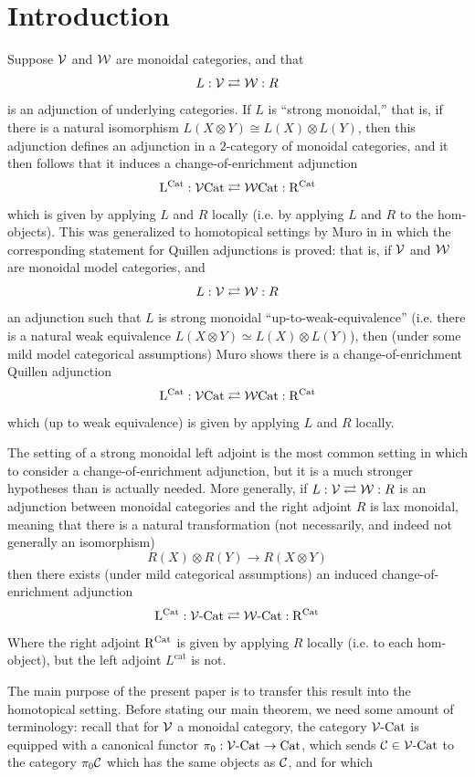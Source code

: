 \documentclass[12pt]{amsart}
\begin{document}
\section*{Introduction}
Suppose $\mathcal{V}$ and $\mathcal{W}$ are monoidal categories, and that 
$$L: \mathcal{V} \rightleftarrows \mathcal{W}: R $$
is an adjunction of underlying categories.
If $L$ is ``strong monoidal,'' that is, if there is a natural isomorphism $L(X \otimes Y) \cong L(X) \otimes L(Y)$, then this adjunction defines an adjunction in a $2$-category of monoidal categories, and it then follows that it induces a change-of-enrichment adjunction
$$\mathrm{L}^{\mathrm{Cat}}: \mathcal{V}\mathrm{Cat} \rightleftarrows \mathcal{W}\mathrm{Cat}: \mathrm{R}^{\mathrm{Cat}}$$
which is given by applying $L$ and $R$ locally (i.e. by applying $L$ and $R$ to the hom-objects).
This was generalized to homotopical settings by Muro in \cite{Muro2012} in which the corresponding statement for Quillen adjunctions is proved: that is, if $\mathcal{V}$ and $\mathcal{W}$ are monoidal model categories, and
$$L: \mathcal{V} \rightleftarrows \mathcal{W}: R $$
an adjunction such that $L$ is strong monoidal ``up-to-weak-equivalence'' (i.e. there is a natural weak equivalence $L(X \otimes Y) \simeq L(X) \otimes L(Y)$), then (under some mild model categorical assumptions) Muro shows there is a change-of-enrichment Quillen adjunction
$$\mathrm{L}^{\mathrm{Cat}}: \mathcal{V}\mathrm{Cat} \rightleftarrows \mathcal{W}\mathrm{Cat}: \mathrm{R}^{\mathrm{Cat}}$$
which (up to weak equivalence) is given by applying $L$ and $R$ locally.
\par
The setting of a strong monoidal left adjoint is the most common setting in which to consider a change-of-enrichment adjunction, but it is a much stronger hypotheses than is actually needed. 
More generally, if $L: \mathcal{V} \rightleftarrows \mathcal{W}: R $ is an adjunction between monoidal categories and the right adjoint $R$ is lax monoidal, meaning that there is a natural transformation (not necessarily, and indeed not generally an isomorphism) 
$$R(X) \otimes R(Y) \to R(X \otimes Y)$$
then there exists (under mild categorical assumptions) an induced change-of-enrichment adjunction
$$\mathrm{L}^{\mathrm{Cat}}: \mathcal{V}\text{-}\mathrm{Cat} \rightleftarrows \mathcal{W}\text{-}\mathrm{Cat}: \mathrm{R}^{\mathrm{Cat}}$$
Where the right adjoint $\mathrm{R}^{\mathrm{Cat}}$ is given by applying $R$ locally (i.e. to each hom-object), but the left adjoint $L^\mathrm{cat}$ is not.
\par 
The main purpose of the present paper is to transfer this result into the homotopical setting. Before stating our main theorem, we need some amount of terminology: recall that for $\mathcal{V}$ a monoidal category, the category $\mathcal{V}\text{-}\mathrm{Cat}$ is equipped with a canonical functor $\pi_0 : \mathcal{V}\text{-}\mathrm{Cat} \to \mathrm{Cat}$, which sends $\mathcal{C} \in \mathcal{V}\text{-}\mathrm{Cat}$ to the category $\pi_0\mathcal{C}$ which has the same objects as $\mathcal{C}$, and for which
\end{document}
